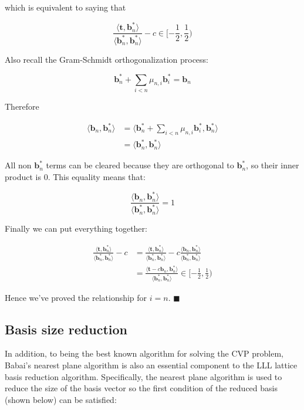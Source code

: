 \documentclass[letterpaper,12pt]{article}
\begin{document}
which is equivalent to saying that

$$
\frac{
    \langle\mathbf{t}, \mathbf{b}_n^\ast\rangle
}{
    \langle\mathbf{b}_n^\ast, \mathbf{b}_n^\ast\rangle
}
- c \in [-\frac{1}{2}, \frac{1}{2})
$$

Also recall the Gram-Schmidt orthogonalization process:

$$
\mathbf{b}_n^\ast +\sum_{i<n}\mu_{n, i}\mathbf{b}_i^\ast = \mathbf{b}_n
$$

Therefore

$$
\begin{aligned}
\langle\mathbf{b}_n, \mathbf{b}_n^\ast\rangle
&= \langle 
    \mathbf{b}_n^\ast +\sum_{i<n}\mu_{n, i}\mathbf{b}_i^\ast, \mathbf{b}_n^\ast
\rangle \\
&= \langle\mathbf{b}_n^\ast, \mathbf{b}_n^\ast\rangle
\end{aligned}
$$

All non $\mathbf{b}_n^\ast$ terms can be cleared because they are orthogonal to $\mathbf{b}_n^\ast$, so their inner product is 0. This equality means that:

$$
\frac{
    \langle\mathbf{b}_n, \mathbf{b}_n^\ast\rangle
}{
    \langle\mathbf{b}_n^\ast, \mathbf{b}_n^\ast\rangle
} = 1
$$

Finally we can put everything together:

$$
\begin{aligned}
\frac{
    \langle\mathbf{t}, \mathbf{b}_n^\ast\rangle
}{
    \langle\mathbf{b}_n^\ast, \mathbf{b}_n^\ast\rangle
}
- c 
&= \frac{
    \langle\mathbf{t}, \mathbf{b}_n^\ast\rangle
}{
    \langle\mathbf{b}_n^\ast, \mathbf{b}_n^\ast\rangle
}
- c \frac{
    \langle\mathbf{b}_n, \mathbf{b}_n^\ast\rangle
}{
    \langle\mathbf{b}_n^\ast, \mathbf{b}_n^\ast\rangle
} \\
&= \frac{
    \langle\mathbf{t} - c\mathbf{b}_n, \mathbf{b}_n^\ast\rangle
}{
    \langle\mathbf{b}_n^\ast, \mathbf{b}_n^\ast\rangle
}
\in [-\frac{1}{2}, \frac{1}{2})
\end{aligned}
$$

Hence we've proved the relationship for $i = n$. $\blacksquare$

\subsection{Basis size reduction}
In addition, to being the best known algorithm for solving the CVP problem, Babai's nearest plane algorithm is also an essential component to the LLL lattice basis reduction algorithm. Specifically, the nearest plane algorithm is used to reduce the size of the basis vector so the first condition of the reduced basis (shown below) can be satisfied:
\end{document}
